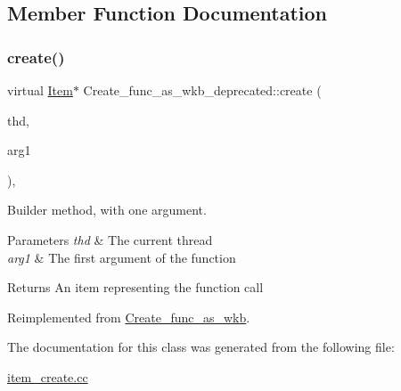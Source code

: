 \subsection{Member Function Documentation}
\mbox{\label{classCreate__func__as__wkb__deprecated_ae98811a32d56c5283066bf6ecd63f0e1}} 
\subsubsection{\texorpdfstring{create()}{create()}}
{\footnotesize\ttfamily virtual \mbox{\hyperlink{classItem}{Item}}$\ast$ Create\+\_\+func\+\_\+as\+\_\+wkb\+\_\+deprecated\+::create (\begin{DoxyParamCaption}\item[{T\+HD $\ast$}]{thd,  }\item[{\mbox{\hyperlink{classItem}{Item}} $\ast$}]{arg1 }\end{DoxyParamCaption})\hspace{0.3cm}{\ttfamily [inline]}, {\ttfamily [virtual]}}

Builder method, with one argument. 
\begin{DoxyParams}{Parameters}
{\em thd} & The current thread \\
\hline
{\em arg1} & The first argument of the function \\
\hline
\end{DoxyParams}
\begin{DoxyReturn}{Returns}
An item representing the function call 
\end{DoxyReturn}


Reimplemented from \mbox{\hyperlink{classCreate__func__as__wkb_a23a8a1800ba7753c66e680e35451d8a4}{Create\+\_\+func\+\_\+as\+\_\+wkb}}.



The documentation for this class was generated from the following file\+:\begin{DoxyCompactItemize}
\item 
\mbox{\hyperlink{item__create_8cc}{item\+\_\+create.\+cc}}\end{DoxyCompactItemize}
